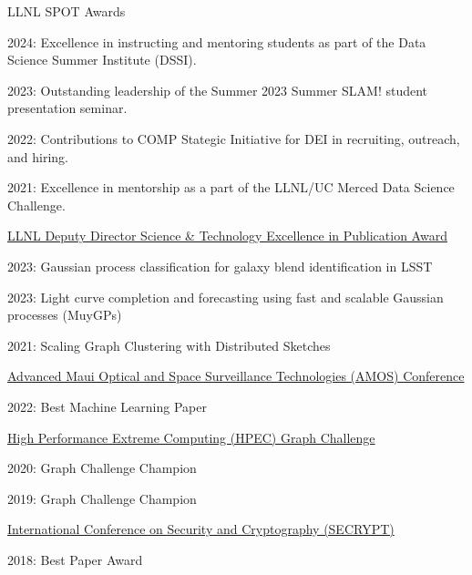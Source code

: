 LLNL SPOT Awards
\begin{innerlist}
  \item[] 2024: Excellence in instructing and mentoring students as part of the Data Science Summer Institute (DSSI).
  \item[] 2023: Outstanding leadership of the Summer 2023 Summer SLAM! student presentation seminar. 
  \item[] 2022: Contributions to COMP Stategic Initiative for DEI in recruiting, outreach, and hiring.
  \item[] 2021: Excellence in mentorship as a part of the LLNL/UC Merced Data Science Challenge.
\end{innerlist}

\halfblankline

\href{https://st.llnl.gov/news/directors-awards}{LLNL Deputy Director Science \& Technology Excellence in Publication Award}
\begin{innerlist}
  \item[] 2023: Gaussian process classification for galaxy blend identification in LSST
  \item[] 2023: Light curve completion and forecasting using fast and scalable Gaussian processes (MuyGPs)
  \item[] 2021: Scaling Graph Clustering with Distributed Sketches
\end{innerlist}

\halfblankline

\href{https://amostech.com/}{Advanced Maui Optical and Space Surveillance Technologies (AMOS) Conference}
\begin{innerlist}
  \item[] 2022: Best Machine Learning Paper
\end{innerlist}

\halfblankline

\href{https://graphchallenge.mit.edu/champions}{High Performance Extreme Computing (HPEC) Graph Challenge}
\begin{innerlist}
  \item[] 2020: Graph Challenge Champion
  \item[] 2019: Graph Challenge Champion
\end{innerlist}

\halfblankline

\href{http://www.secrypt.icete.org/PreviousAwards.aspx}{International Conference on Security and Cryptography (SECRYPT)}
\begin{innerlist}
  \item[] 2018: Best Paper Award
\end{innerlist}

